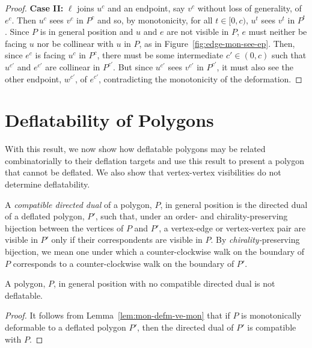 \documentclass[11pt]{amsart}
\begin{document}
\begin{proof}
  \noindent\textbf{Case II:} $\ell$ joins $u^c$ and an
  endpoint, say $v^c$ without loss of generality, of $e^c$.  Then
  $u^c$ sees $v^c$ in $P^c$ and so, by monotonicity, for all
  $t\in[0,c)$, $u^t$ sees $v^t$ in $P^t$.  Since $P$ is in general
  position and $u$ and $e$ are not visible in $P$, $e$ must neither be
  facing $u$ nor be collinear with $u$ in $P$, as in
  Figure~\ref{fig:edge-mon-see-ep}.  Then, since $e^c$ is facing $u^c$
  in $P^c$, there must be some intermediate $c'\in(0,c)$ such that
  $u^{c'}$ and $e^{c'}$ are collinear in $P^{c'}$.  But since $u^{c'}$
  sees $v^{c'}$ in $P^{c'}$, it must also see the other endpoint,
  $w^{c'}$, of $e^{c'}$, contradicting the monotonicity of the
  deformation.
\end{proof}

\section{Deflatability of Polygons}

With this result, we now show how deflatable polygons may be related
combinatorially to their deflation targets and use this result to
present a polygon that cannot be deflated.  We also show that
vertex-vertex visibilities do not determine deflatability.



A \emph{compatible directed dual} of a polygon, $P$, in general
position is the directed dual of a deflated polygon, $P'$, such that,
under an order- and chirality-preserving bijection between the
vertices of $P$ and $P'$, a vertex-edge or vertex-vertex pair are
visible in $P'$ only if their correspondents are visible in $P$.  By
\emph{chirality-}preserving bijection, we mean one under which a
counter-clockwise walk on the boundary of $P$ corresponds to a
counter-clockwise walk on the boundary of $P'$.

\begin{theorem}
  \label{thm:no-cdd-not-defl}
  A polygon, $P$, in general position with no compatible directed dual
  is not deflatable.
\end{theorem}
\begin{proof}
  It follows from Lemma~\ref{lem:mon-defm-ve-mon} that if $P$ is
  monotonically deformable to a deflated polygon $P'$, then the
  directed dual of $P'$ is compatible with $P$.
\end{proof}
\end{document}

